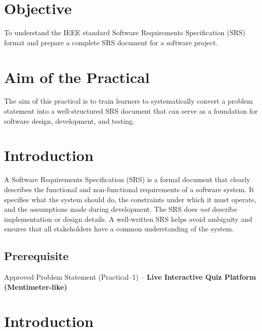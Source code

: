 \documentclass[12pt,a4paper]{article}
\begin{document}
\newpage
\section*{Objective}
To understand the IEEE standard Software Requirements Specification (SRS) format and
prepare a complete SRS document for a software project.

\section*{Aim of the Practical}
The aim of this practical is to train learners to systematically convert a problem
statement into a well-structured SRS document that can serve as a foundation for
software design, development, and testing.

\section*{Introduction}
A Software Requirements Specification (SRS) is a formal document that clearly
describes the functional and non-functional requirements of a software system.
It specifies what the system should do, the constraints under which it must operate,
and the assumptions made during development. The SRS does \emph{not} describe
implementation or design details. A well-written SRS helps avoid ambiguity and
ensures that all stakeholders have a common understanding of the system.

\subsection*{Prerequisite}
Approved Problem Statement (Practical--1) --
\textbf{Live Interactive Quiz Platform (Mentimeter-like)}

\newpage
\tableofcontents
\newpage

\setcounter{section}{0}

\section{Introduction}
\end{document}
